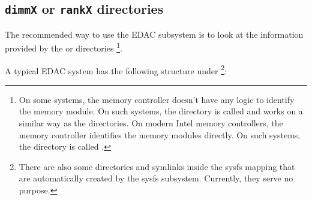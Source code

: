 \documentclass[a4paper,8pt,english]{sphinxmanual}
\begin{document}
\subsection{\texttt{dimmX} or \texttt{rankX} directories}
\label{admin-guide/ras:dimmx-or-rankx-directories}
The recommended way to use the EDAC subsystem is to look at the information
provided by the  or  directories \footnote[5]{
On some systems, the memory controller doesn't have any logic
to identify the memory module. On such systems, the directory is called  and works on a similar way as the  directories.
On modern Intel memory controllers, the memory controller identifies the
memory modules directly. On such systems, the directory is called .
}.

A typical EDAC system has the following structure under
\footnote[6]{
There are also some  directories and 
symlinks inside the sysfs mapping that are automatically created by
the sysfs subsystem. Currently, they serve no purpose.
}:
\end{document}
